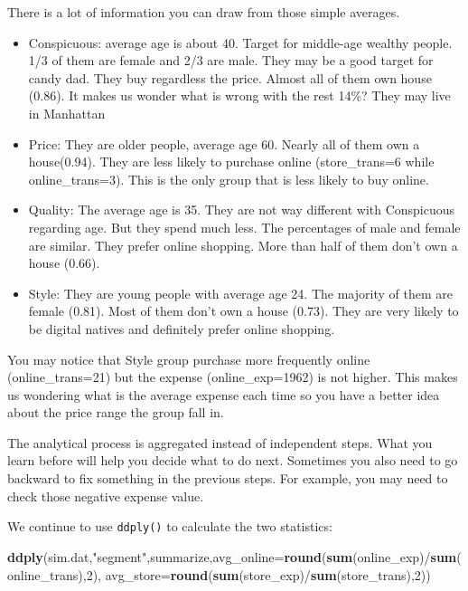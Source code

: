 \documentclass[]{book}
\newenvironment{Shaded}{\begin{snugshade}}{\end{snugshade}}
\newcommand{\KeywordTok}[1]{\textcolor[rgb]{0.13,0.29,0.53}{\textbf{{#1}}}}
\newcommand{\DataTypeTok}[1]{\textcolor[rgb]{0.13,0.29,0.53}{{#1}}}
\newcommand{\DecValTok}[1]{\textcolor[rgb]{0.00,0.00,0.81}{{#1}}}
\newcommand{\StringTok}[1]{\textcolor[rgb]{0.31,0.60,0.02}{{#1}}}
\newcommand{\NormalTok}[1]{{#1}}
\theoremstyle{definition}
\theoremstyle{definition}
\theoremstyle{remark}
\begin{document}
There is a lot of information you can draw from those simple averages.

\begin{itemize}
\item
  Conspicuous: average age is about 40. Target for middle-age wealthy
  people. 1/3 of them are female and 2/3 are male. They may be a good
  target for candy dad. They buy regardless the price. Almost all of
  them own house (0.86). It makes us wonder what is wrong with the rest
  14\%? They may live in Manhattan
\item
  Price: They are older people, average age 60. Nearly all of them own a
  house(0.94). They are less likely to purchase online (store\_trans=6
  while online\_trans=3). This is the only group that is less likely to
  buy online.
\item
  Quality: The average age is 35. They are not way different with
  Conspicuous regarding age. But they spend much less. The percentages
  of male and female are similar. They prefer online shopping. More than
  half of them don't own a house (0.66).
\item
  Style: They are young people with average age 24. The majority of them
  are female (0.81). Most of them don't own a house (0.73). They are
  very likely to be digital natives and definitely prefer online
  shopping.
\end{itemize}

You may notice that Style group purchase more frequently online
(online\_trans=21) but the expense (online\_exp=1962) is not higher.
This makes us wondering what is the average expense each time so you
have a better idea about the price range the group fall in.

The analytical process is aggregated instead of independent steps. What
you learn before will help you decide what to do next. Sometimes you
also need to go backward to fix something in the previous steps. For
example, you may need to check those negative expense value.

We continue to use \texttt{ddply()} to calculate the two statistics:

\begin{Shaded}
\begin{Highlighting}[]
\KeywordTok{ddply}\NormalTok{(sim.dat,}\StringTok{"segment"}\NormalTok{,summarize,}\DataTypeTok{avg_online=}\KeywordTok{round}\NormalTok{(}\KeywordTok{sum}\NormalTok{(online_exp)/}\KeywordTok{sum}\NormalTok{(online_trans),}\DecValTok{2}\NormalTok{),}
      \DataTypeTok{avg_store=}\KeywordTok{round}\NormalTok{(}\KeywordTok{sum}\NormalTok{(store_exp)/}\KeywordTok{sum}\NormalTok{(store_trans),}\DecValTok{2}\NormalTok{))}
\end{Highlighting}
\end{Shaded}
\end{document}
